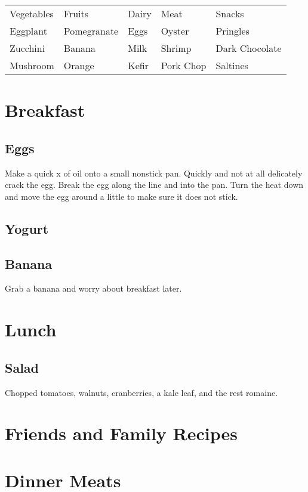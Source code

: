 \documentclass{article}
\begin{document}
\begin{table}
\begin{tabular}{lllll}
Vegetables & Fruits & Dairy & Meat & Snacks \\
Eggplant   & Pomegranate & Eggs & Oyster & Pringles \\
Zucchini   & Banana  & Milk & Shrimp & Dark Chocolate \\
Mushroom   & Orange & Kefir & Pork Chop & Saltines 
\end{tabular}
\end{table}

\section*{Breakfast}

\subsection*{Eggs}
Make a quick x of oil onto a small nonstick pan. Quickly and not at all delicately crack the egg. Break the egg along the line and into the pan. Turn the heat down and move the egg around a little to make sure it does not stick.   

\subsection*{Yogurt}

\subsection*{Banana}
Grab a banana and worry about breakfast later.

\section*{Lunch}

\subsection*{Salad}
Chopped tomatoes, walnuts, cranberries, a kale leaf, and the rest romaine. 
\section*{Friends and Family Recipes}
\section*{Dinner Meats}
\end{document}
